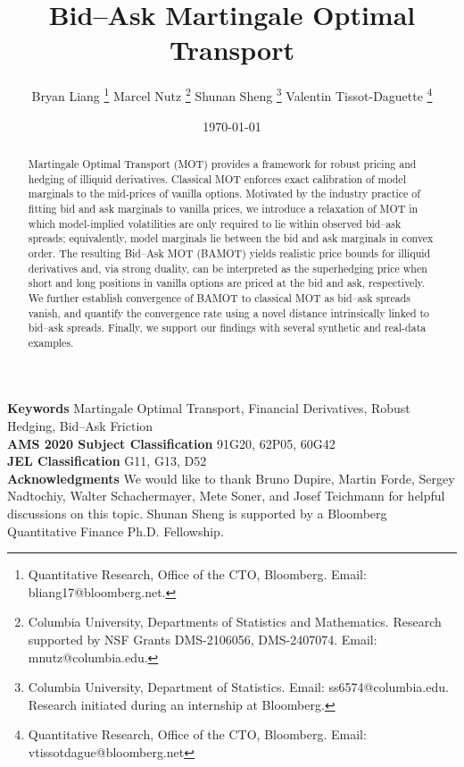 \documentclass[11pt]{article}
\theoremstyle{plain}
\theoremstyle{definition}
\theoremstyle{remark}
\theoremstyle{plain}
\begin{document}
\title{Bid--Ask Martingale Optimal Transport}


\newcommand\blfootnote[1]{%
  \begingroup
  \renewcommand\thefootnote{}\footnote{#1}%
  \addtocounter{footnote}{-1}%
  \endgroup
}



\author{
Bryan Liang%
 \thanks{
  Quantitative Research, Office of the CTO, Bloomberg. Email: bliang17@bloomberg.net. } \hspace{1em}
 Marcel Nutz%
  \thanks{
  Columbia University, Departments of Statistics and Mathematics.  Research supported by NSF Grants DMS-2106056, DMS-2407074. Email: mnutz@columbia.edu.} \hspace{1em}
  Shunan Sheng%
  \thanks{
  Columbia University, Department of Statistics. Email: ss6574@columbia.edu. Research initiated during an internship at Bloomberg.} \hspace{1em}
Valentin Tissot-Daguette%
  \thanks{
  Quantitative Research, Office of the CTO, Bloomberg. Email: vtissotdague@bloomberg.net}  
}
\date{\today}
\maketitle 


\begin{abstract}
Martingale Optimal Transport (MOT) provides a framework for robust pricing and hedging of illiquid derivatives. Classical MOT enforces exact calibration of model marginals to the mid-prices of vanilla options. Motivated by the industry practice of fitting bid and ask marginals to vanilla prices, we introduce a relaxation of MOT in which model-implied volatilities are only required to lie within observed bid--ask spreads; equivalently, model marginals lie between the bid and ask marginals in convex order. The resulting Bid--Ask MOT (BAMOT) yields realistic price bounds for illiquid derivatives and, via strong duality, can be interpreted as the superhedging price when short and long positions in vanilla options are priced at the bid and ask, respectively. We further establish convergence of BAMOT to classical MOT as bid--ask spreads vanish, and quantify the convergence rate using a novel distance intrinsically linked to bid--ask spreads. Finally, we support our findings with several synthetic and real-data examples.
\end{abstract}

\vspace{.9em}

{\small
\noindent\textbf{Keywords} Martingale Optimal Transport, Financial Derivatives, Robust Hedging, Bid--Ask Friction
\\
\noindent\textbf{AMS 2020 Subject Classification} 
91G20,  	%
62P05,  %
60G42 %
\\
\noindent\textbf{JEL Classification} G11, G13, D52\\
\noindent\textbf{Acknowledgments} We would like to thank  Bruno Dupire, Martin Forde,  Sergey Nadtochiy, Walter Schachermayer, Mete Soner, and %
 Josef Teichmann %
 for helpful discussions on this topic. Shunan Sheng is supported by a Bloomberg Quantitative Finance Ph.D. Fellowship.
}
\end{document}

